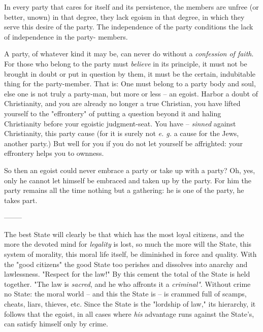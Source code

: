 \documentclass[a4paper]{book}
\begin{document}
In every party that cares for itself and its persistence, the members are 
unfree (or better, unown) in that degree, they lack egoism in that degree, in 
which they serve this desire of the party. The independence of the party 
conditions the lack of independence in the party- members.

A party, of whatever kind it may be, can never do without a \textit{confession 
of faith}. For those who belong to the party must \textit{believe} in its 
principle, it must not be brought in doubt or put in question by them, it must 
be the certain, indubitable thing for the party-member. That is: One must 
belong to a party body and soul, else one is not truly a party-man, but more 
or less -- an egoist. Harbor a doubt of Christianity, and you are already no 
longer a true Christian, you have lifted yourself to the "{}effrontery"{} of 
putting a question beyond it and haling Christianity before your egoistic 
judgment-seat. You have -- \textit{sinned} against Christianity, this party 
cause (for it is surely not \textit{e. g.} a cause for the Jews, another 
party.) But well for you if you do not let yourself be affrighted: your 
effrontery helps you to ownness.

So then an egoist could never embrace a party or take up with a party? Oh, 
yes, only he cannot let himself be embraced and taken up by the party. For him 
the party remains all the time nothing but a gathering: he is one of the 
party, he takes part.

\begin{center}
--------\end{center}


The best State will clearly be that which has the most loyal citizens, and the 
more the devoted mind for \textit{legality} is lost, so much the more will the 
State, this system of morality, this moral life itself, be diminished in force 
and quality. With the "{}good citizens"{} the good State too perishes and 
dissolves into anarchy and lawlessness. "{}Respect for the law!"{} By this 
cement the total of the State is held together. "{}The law is \textit{sacred}, 
and he who affronts it a \textit{criminal"{}}. Without crime no State: the 
moral world -- and this the State is -- is crammed full of scamps, cheats, 
liars, thieves, etc. Since the State is the "{}lordship of law,"{} its 
hierarchy, it follows that the egoist, in all cases where \textit{his} 
advantage runs against the State's, can satisfy himself only by crime.
\end{document}
